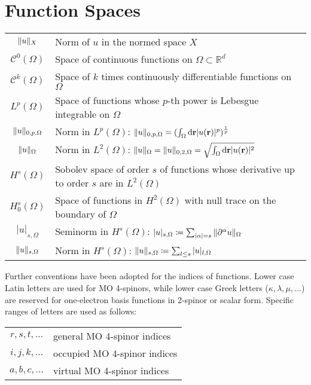\section*{Function Spaces}
\begin{tabular}{c l}
 $\| u \|_{X}$ & Norm of $u$ in the normed space $X$ \\
 $\mathcal{C}^0(\Omega)$ & Space of continuous
 functions on $\Omega\subset\mathbb{R}^d$ \\
 $\mathcal{C}^k(\Omega)$ & Space of $k$ times
 continuously differentiable functions on $\Omega$ \\
 $L^p(\Omega)$ & Space of functions whose $p$-th power is Lebesgue
 integrable on $\Omega$ \\
 $\| u \|_{0, p, \Omega}$ & Norm in $L^p(\Omega)$: $\| u \|_{0, p,
 \Omega} = (\int_\Omega\mathop{}\!\mathrm{d}\mathbf{r} |u(\mathbf{r})|^p)^\frac{1}{p}$ \\
 $\| u \|_{\Omega}$ & Norm in $L^2(\Omega)$:
 $\| u \|_{\Omega} = \| u \|_{0, 2,\Omega} = \sqrt{\int_\Omega\mathop{}\!\mathrm{d}\mathbf{r} |u(\mathbf{r})|^2}$ \\
 $H^s(\Omega)$ & Sobolev space of order $s$ of functions whose
 derivative up to order $s$ are in $L^2(\Omega)$ \\
 $H_0^s(\Omega)$ & Space of functions in $H^2(\Omega)$ with null trace on the boundary of $\Omega$ \\
 $|u|_{s, \Omega}$ & Seminorm in $H^s(\Omega)$:
 $|u|_{s, \Omega} \coloneq \sum_{|\alpha|=s}\| \partial^\alpha u \|_{\Omega}$ \\
 $\| u \|_{s, \Omega}$ & Norm in $H^s(\Omega)$:
 $\| u \|_{s, \Omega} \coloneq \sum_{l \leq s} |u|_{l, \Omega}$
\end{tabular}

Further conventions have been adopted for the indices of functions.
Lower case Latin letters are used for \ac{MO} 4-spinors, while lower case
Greek letters ($\kappa, \lambda, \mu, \ldots$) are reserved for
one-electron basis functions in 2-spinor or scalar form.
Specific ranges of letters are used as follows:
\begin{table*}[!h]
\begin{tabular}{c l}
 $r, s, t, \ldots$ & general MO 4-spinor indices \\
 $i, j, k, \ldots$ & occupied MO 4-spinor indices \\
 $a, b, c, \ldots$ & virtual MO 4-spinor indices
\end{tabular}
\end{table*}

